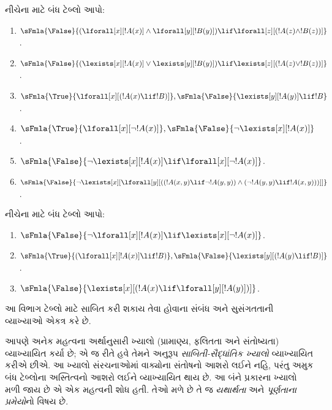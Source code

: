 \begin{prob}
નીચેના માટે બંધ ટેબ્લો આપો:
\begin{enumerate}
\item $\sFmla{\False}{(\lforall[x][!A(x)] \land \lforall[y][!B(y)])
\lif \lforall[z][(!A(z) \land !B(z))]}$.
\item $\sFmla{\False}{(\lexists[x][!A(x)] \lor \lexists[y][!B(y)])
\lif \lexists[z][(!A(z) \lor !B(z))]}$.
\item $\sFmla{\True}{\lforall[x][(!A(x) \lif !B)]},
\sFmla{\False}{\lexists[y][!A(y)] \lif !B}$.
\item $\sFmla{\True}{\lforall[x][\lnot !A(x)]},
\sFmla{\False}{\lnot\lexists[x][!A(x)]}$.
\item $\sFmla{\False}{\lnot\lexists[x][!A(x)] \lif \lforall[x][\lnot
!A(x)]}$.
\item $\sFmla{\False}{\lnot\lexists[x][\lforall[y][((!A(x,y) \lif
\lnot !A(y,y)) \land (\lnot !A(y,y) \lif !A(x,y)))]]}$.
\end{enumerate}
\end{prob}

\begin{prob}
નીચેના માટે બંધ ટેબ્લો આપો:
\begin{enumerate}
\item $\sFmla{\False}{\lnot\lforall[x][!A(x)] \lif \lexists[x][\lnot!A(x)]}$.
\item $\sFmla{\True}{(\lforall[x][!A(x)] \lif !B)}, \sFmla{\False}{\lexists[y][(!A(y) \lif !B)]}$.
\item $\sFmla{\False}{\lexists[x][(!A(x) \lif \lforall[y][!A(y)])]}$.
\end{enumerate}
\end{prob}
\endgroup


\begingroup
\makeatletter{}\makeatother


\label{guunit:OLP-0105}


\begin{editorial}
આ વિભાગ ટેબ્લો માટે સાબિત કરી શકાય તેવા હોવાના સંબંધ અને સુસંગતતાની
વ્યાખ્યાઓ એકત્ર કરે છે.
\end{editorial}

\begin{explain}
આપણે અનેક મહત્વના અર્થાનુસારી ખ્યાલો (પ્રામાણ્ય, ફલિતતા અને સંતોષ્યતા)
વ્યાખ્યાયિત કર્યા છે; એ જ રીતે હવે તેમને અનુરૂપ \emph{સાબિતી-સૈદ્ધાંતિક
ખ્યાલો} વ્યાખ્યાયિત કરીએ છીએ. આ ખ્યાલો સંરચનાઓમાં
વાક્યોના સંતોષનો આશરો લઈને નહિ, પરંતુ અમુક બંધ ટેબ્લોના
અસ્તિત્વનો આશરો લઈને વ્યાખ્યાયિત થાય છે. આ બંને પ્રકારના ખ્યાલો મળી જાય
છે એ એક મહત્વની શોધ હતી. તેઓ મળે છે તે જ \emph{યથાર્થતા} અને
\emph{પૂર્ણતાના પ્રમેયો}નો વિષય છે.
\end{explain}


